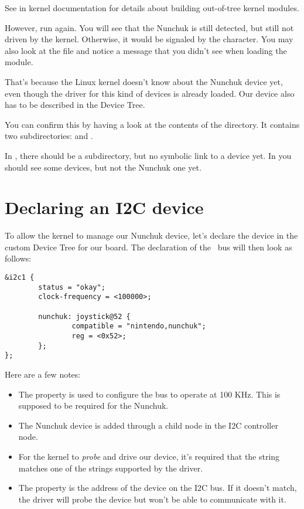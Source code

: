 {See  in kernel documentation
for details about building out-of-tree kernel modules.

However, run  again. You will see that the
Nunchuk is still detected, but still not driven by the kernel.
Otherwise, it would be signaled by the  character. You
may also look at the  file and notice a
 message that you didn't
see when loading the module.

That's because the Linux kernel doesn't know about the Nunchuk
device yet, even though the driver for this kind of devices is
already loaded. Our device also has to be described in the Device Tree.

You can confirm this by having a look at the contents of the
 directory.  It contains two subdirectories:
 and .

In , there should be a  subdirectory,
but no symbolic link to a device yet. In  you should
see some devices, but not the Nunchuk one yet.

\section{Declaring an I2C device}

To allow the kernel to manage our Nunchuk device, let's declare the
device in the custom Device Tree for our board. The declaration of the \busname\ 
bus will then look as follows:

\begin{verbatim}
&i2c1 {
        status = "okay";
        clock-frequency = <100000>;

        nunchuk: joystick@52 {
                compatible = "nintendo,nunchuk";
                reg = <0x52>;
        };
};
\end{verbatim}

Here are a few notes:
\begin{itemize}
\item The  property is used to configure the bus
      to operate at 100 KHz. This is supposed to be required for the
      Nunchuk.
\item The Nunchuk device is added through a child node in the I2C
      controller node.
\item For the kernel to {\em probe} and drive our device, it's required
      that the  string matches one of the
      \code{compatible} strings supported by the driver.
\item The  property is the address of the device on the
      I2C bus. If it doesn't match, the driver will probe the device
      but won't be able to communicate with it.
\end{itemize}

}
